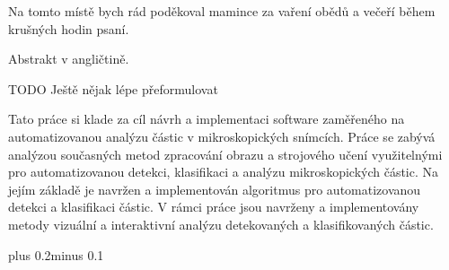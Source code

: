 \documentclass[11pt,twoside,a4paper]{book}
\begin{document}

\coverpagestarts


\acknowledgements
\noindent
Na tomto místě bych rád poděkoval mamince za vaření obědů a večeří během krušných hodin psaní.





 
\abstractpage

Abstrakt v angličtině.


\baselineskip

\noindent
TODO Ještě nějak lépe přeformulovat

Tato práce si klade za cíl návrh a implementaci software zaměřeného na automatizovanou analýzu částic v mikroskopických snímcích. Práce se zabývá analýzou současných metod zpracování obrazu a strojového učení využitelnými pro automatizovanou detekci, klasifikaci a analýzu mikroskopických částic. Na jejím základě je navržen a implementován algoritmus pro automatizovanou detekci a klasifikaci částic. V rámci práce jsou navrženy a implementovány metody vizuální a interaktivní analýzu detekovaných a klasifikovaných částic.

\tableofcontents

\listoffigures

\listoftables


\mainbodystarts
\fontsize{11pt}{15pt}\selectfont
{}\baselineskip plus 0.2\baselineskip minus 0.1\baselineskip

\end{document}
